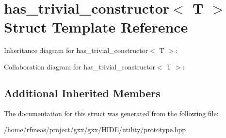 \hypertarget{structhas__trivial__constructor}{}\section{has\+\_\+trivial\+\_\+constructor$<$ T $>$ Struct Template Reference}
\label{structhas__trivial__constructor}


Inheritance diagram for has\+\_\+trivial\+\_\+constructor$<$ T $>$\+:


Collaboration diagram for has\+\_\+trivial\+\_\+constructor$<$ T $>$\+:
\subsection*{Additional Inherited Members}


The documentation for this struct was generated from the following file\+:\begin{DoxyCompactItemize}
\item 
/home/rfmeas/project/gxx/gxx/\+H\+I\+D\+E/utility/prototype.\+hpp\end{DoxyCompactItemize}

